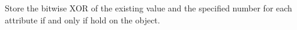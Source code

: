Store the bitwise XOR of the existing value and the specified number for each
attribute if and only if  hold on the object.




